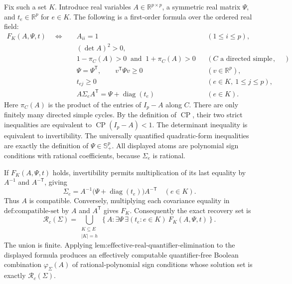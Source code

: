 Fix such a set \(K\).  Introduce real variables \(A\in\mathbb R^{p\times p}\), a symmetric real matrix \(\Psi\), and \(t_e\in\mathbb R^p\) for \(e\in K\).  The following is a first-order formula over the ordered real field:
\[
\begin{aligned}
 F_K(A,\Psi,t)\quad\Longleftrightarrow\quad
 &A_{ii}=1 &&(1\leq i\leq p),\\
 &(\det A)^2>0,\\
 &1-\pi_C(A)>0\ \text{ and }\ 1+\pi_C(A)>0
   &&(C\text{ a directed simple cycle}),\\
 &\Psi=\Psi^{\mathsf T},\qquad
   v^{\mathsf T}\Psi v\geq0 &&(v\in\mathbb R^p),\\
 &t_{ej}\geq0 &&(e\in K,\ 1\leq j\leq p),\\
 &A\Sigma_eA^{\mathsf T}=\Psi+\operatorname{diag}(t_e)
   &&(e\in K).
\end{aligned}
\]
Here \(\pi_C(A)\) is the product of the entries of \(I_p-A\) along \(C\).  There are only finitely many directed simple cycles.  By the definition of \(\operatorname{CP}\), their two strict inequalities are equivalent to \(\operatorname{CP}(I_p-A)<1\).  The determinant inequality is equivalent to invertibility.  The universally quantified quadratic-form inequalities are exactly the definition of \(\Psi\in\mathbb S_+^p\).  All displayed atoms are polynomial sign conditions with rational coefficients, because \(\Sigma_e\) is rational.

If \(F_K(A,\Psi,t)\) holds, invertibility permits multiplication of its last equality by \(A^{-1}\) and \(A^{-\mathsf T}\), giving
\[
 \Sigma_e=A^{-1}\bigl(\Psi+\operatorname{diag}(t_e)\bigr)A^{-\mathsf T}
 \quad(e\in K).
\]
Thus \(A\) is compatible.  Conversely, multiplying each covariance equality in \(\text{def:compatible-set}\) by \(A\) and \(A^{\mathsf T}\) gives \(F_K\).  Consequently the exact recovery set is
\[
 \mathcal R_c(\Sigma)
 =\bigcup_{\substack{K\subseteq E\\ |K|=h}}
   \left\{A:\exists\Psi\,\exists(t_e:e\in K)\ F_K(A,\Psi,t)\right\}.
\]
The union is finite.  Applying \(\text{lem:effective-real-quantifier-elimination}\) to the displayed formula produces an effectively computable quantifier-free Boolean combination \(\varphi_\Sigma(A)\) of rational-polynomial sign conditions whose solution set is exactly \(\mathcal R_c(\Sigma)\).

